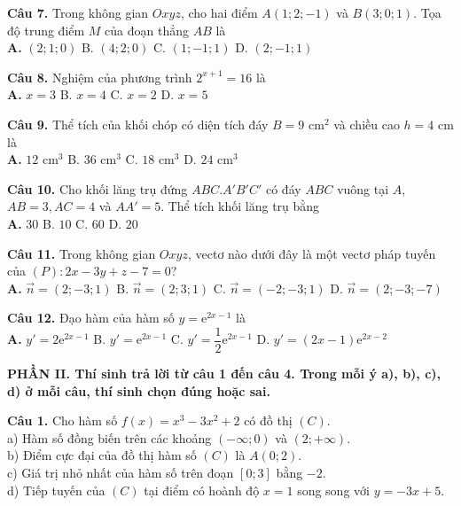 \documentclass[12pt,a4paper]{article}
\begin{document}
\vspace{0.2cm}
\textbf{Câu 7.} Trong không gian $Oxyz$, cho hai điểm $A(1; 2; -1)$ và $B(3; 0; 1)$. Tọa độ trung điểm $M$ của đoạn thẳng $AB$ là \\
\textbf{A.} $(2; 1; 0)$ \hfill B. $(4; 2; 0)$ \hfill C. $(1; -1; 1)$ \hfill D. $(2; -1; 1)$

\vspace{0.2cm}
\textbf{Câu 8.} Nghiệm của phương trình $2^{x + 1} = 16$ là \\
\textbf{A.} $x = 3$ \hfill B. $x = 4$ \hfill C. $x = 2$ \hfill D. $x = 5$

\vspace{0.2cm}
\textbf{Câu 9.} Thể tích của khối chóp có diện tích đáy $B = 9\text{ cm}^2$ và chiều cao $h = 4\text{ cm}$ là \\
\textbf{A.} $12\text{ cm}^3$ \hfill B. $36\text{ cm}^3$ \hfill C. $18\text{ cm}^3$ \hfill D. $24\text{ cm}^3$

\vspace{0.2cm}
\textbf{Câu 10.} Cho khối lăng trụ đứng $ABC.A'B'C'$ có đáy $ABC$ vuông tại $A$, $AB = 3, AC = 4$ và $AA' = 5$. Thể tích khối lăng trụ bằng \\
\textbf{A.} $30$ \hfill B. $10$ \hfill C. $60$ \hfill D. $20$

\vspace{0.2cm}
\textbf{Câu 11.} Trong không gian $Oxyz$, vectơ nào dưới đây là một vectơ pháp tuyến của $(P): 2x - 3y + z - 7 = 0$? \\
\textbf{A.} $\vec{n} = (2; -3; 1)$ \hfill B. $\vec{n} = (2; 3; 1)$ \hfill C. $\vec{n} = (-2; -3; 1)$ \hfill D. $\vec{n} = (2; -3; -7)$

\vspace{0.2cm}
\textbf{Câu 12.} Đạo hàm của hàm số $y = \mathrm{e}^{2x - 1}$ là \\
\textbf{A.} $y' = 2\mathrm{e}^{2x - 1}$ \hfill B. $y' = \mathrm{e}^{2x - 1}$ \hfill C. $y' = \dfrac{1}{2}\mathrm{e}^{2x - 1}$ \hfill D. $y' = (2x - 1)\mathrm{e}^{2x - 2}$

\vspace{0.4cm}
\textbf{\large PHẦN II. Thí sinh trả lời từ câu 1 đến câu 4. Trong mỗi ý a), b), c), d) ở mỗi câu, thí sinh chọn đúng hoặc sai.}

\vspace{0.2cm}
\textbf{Câu 1.} Cho hàm số $f(x) = x^3 - 3x^2 + 2$ có đồ thị $(C)$. \\
a) Hàm số đồng biến trên các khoảng $(-\infty; 0)$ và $(2; +\infty)$. \\
b) Điểm cực đại của đồ thị hàm số $(C)$ là $A(0; 2)$. \\
c) Giá trị nhỏ nhất của hàm số trên đoạn $[0; 3]$ bằng $-2$. \\
d) Tiếp tuyến của $(C)$ tại điểm có hoành độ $x = 1$ song song với $y = -3x + 5$.
\end{document}
